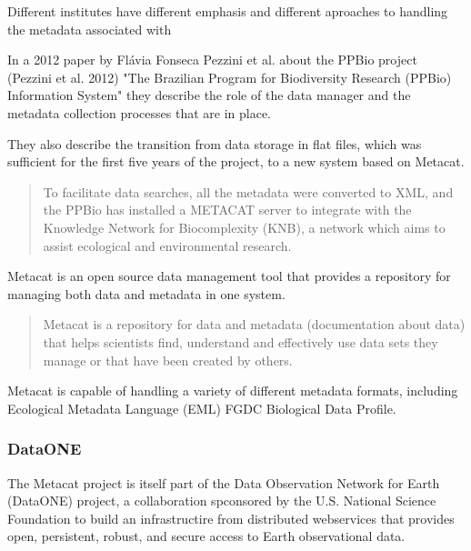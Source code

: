 \documentclass{article}
\begin{document}
Different institutes have different emphasis and different
aproaches to handling the metadata associated with 
 
In a 2012 paper by Flávia Fonseca Pezzini et al. about the PPBio project 
(Pezzini et al. 2012)
"The Brazilian Program for Biodiversity Research (PPBio) Information System"
they describe the role of the data manager and the metadata
collection processes that are in place.

They also describe the transition from data storage in flat files,
which was sufficient for the first five years of the project,
to a new system based on Metacat.

\begin{quote}
To facilitate data searches, all the metadata were converted to XML,
and the PPBio has installed a METACAT server to integrate with the
Knowledge Network for Biocomplexity (KNB), a network which aims to
assist ecological and environmental research.
\end{quote}

Metacat
is an open source data management tool that provides a repository for
managing both data and metadata in one system.

\begin{quote}
Metacat is a repository for data and metadata (documentation about data) that
helps scientists find, understand and effectively use data sets they manage or
that have been created by others.
\end{quote}

Metacat is capable of handling a variety of different metadata formats,
including Ecological Metadata Language (EML)
FGDC Biological Data Profile.

\subsubsection{DataONE}

The Metacat project is itself part of the Data Observation Network for Earth (DataONE)
project, a collaboration spconsored by the U.S. National Science Foundation to build
an infrastructire from distributed webservices that provides open, persistent, robust,
and secure access to Earth observational data.
 
\end{document}
